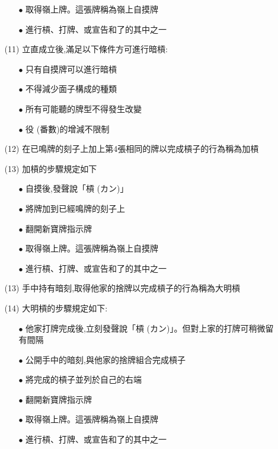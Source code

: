 \documentclass[a4paper,12pt]{article}
\begin{document}
\begin{itemize}
\begin{itemize}
\begin{itemize}
            \item[$\bullet$] 取得嶺上牌。這張牌稱為嶺上自摸牌
            \item[$\bullet$] 進行槓、打牌、或宣告和了的其中之一
        \end{itemize}
        \item[(11)] 立直成立後,滿足以下條件方可進行暗槓:
        \begin{itemize}
            \item[$\bullet$] 只有自摸牌可以進行暗槓
            \item[$\bullet$] 不得減少面子構成的種類
            \item[$\bullet$] 所有可能聽的牌型不得發生改變
            \item[$\bullet$] 役 (番數)的增減不限制
        \end{itemize}
        \item[(12)] 在已鳴牌的刻子上加上第4張相同的牌以完成槓子的行為稱為加槓
        \item[(13)]加槓的步驟規定如下
        \begin{itemize}
            \item[$\bullet$] 自摸後,發聲說「槓 (カン)」
            \item[$\bullet$] 將牌加到已經鳴牌的刻子上
            \item[$\bullet$] 翻開新寶牌指示牌
            \item[$\bullet$] 取得嶺上牌。這張牌稱為嶺上自摸牌
            \item[$\bullet$] 進行槓、打牌、或宣告和了的其中之一
        \end{itemize}
        \item[(13)] 手中持有暗刻,取得他家的捨牌以完成槓子的行為稱為大明槓
        \item[(14)] 大明槓的步驟規定如下:
        \begin{itemize}
            \item[$\bullet$] 他家打牌完成後,立刻發聲說「槓 (カン)」。但對上家的打牌可稍微留有間隔
            \item[$\bullet$] 公開手中的暗刻,與他家的捨牌組合完成槓子
            \item[$\bullet$] 將完成的槓子並列於自己的右端
            \item[$\bullet$] 翻開新寶牌指示牌
            \item[$\bullet$] 取得嶺上牌。這張牌稱為嶺上自摸牌
            \item[$\bullet$] 進行槓、打牌、或宣告和了的其中之一
        \end{itemize}

\end{itemize}
\end{itemize}
\end{document}
